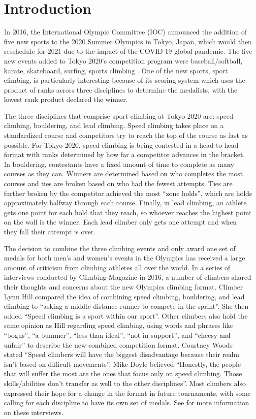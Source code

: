 \documentclass[12pt]{article}
\begin{document}
\hypertarget{introduction}{%
\section{Introduction}\label{introduction}}

In 2016, the International Olympic Committee (IOC) announced the
addition of five new sports to the 2020 Summer Olympics in Tokyo, Japan,
which would then reschedule for 2021 due to the impact of the COVID-19
global pandemic. The five new events added to Tokyo 2020's competition
program were baseball/softball, karate, skateboard, surfing, sports
climbing \citep{ioc2016}. One of the new sports, sport climbing, is
particularly interesting because of its scoring system which uses the
product of ranks across three disciplines to determine the medalists,
with the lowest rank product declared the winner.

The three disciplines that comprise sport climbing at Tokyo 2020 are:
speed climbing, bouldering, and lead climbing. Speed climbing takes
place on a standardized course and competitors try to reach the top of
the course as fast as possible. For Tokyo 2020, speed climbing is being
contested in a head-to-head format with ranks determined by how far a
competitor advances in the bracket. In bouldering, contestants have a
fixed amount of time to complete as many courses as they can. Winners
are determined based on who completes the most courses and ties are
broken based on who had the fewest attempts. Ties are further broken by
the competitor achieved the most ``zone holds'', which are holds
approximately halfway through each course. Finally, in lead climbing, an
athlete gets one point for each hold that they reach, so whoever reaches
the highest point on the wall is the winner. Each lead climber only gets
one attempt and when they fall their attempt is over.

The decision to combine the three climbing events and only award one set
of medals for both men's and women's events in the Olympics has received
a large amount of criticism from climbing athletes all over the world.
In a series of interviews conducted by Climbing Magazine in 2016, a
number of climbers shared their thoughts and concerns about the new
Olympics climbing format. Climber Lynn Hill compared the idea of
combining speed climbing, bouldering, and lead climbing to ``asking a
middle distance runner to compete in the sprint''. She then added
``Speed climbing is a sport within our sport''. Other climbers also hold
the same opinion as Hill regarding speed climbing, using words and
phrases like ``bogus'', ``a bummer'', ``less than ideal'', ``not in
support'', and ``cheesy and unfair'' to describe the new combined
competition format. Courtney Woods stated ``Speed climbers will have the
biggest disadvantage because their realm isn't based on difficult
movements''. Mike Doyle believed ``Honestly, the people that will suffer
the most are the ones that focus only on speed climbing. Those
skills/abilities don't transfer as well to the other disciplines''. Most
climbers also expressed their hope for a change in the format in future
tournaments, with some calling for each discipline to have its own set
of medals. See \citet{blanchard2016} for more information on these
interviews.
\end{document}
